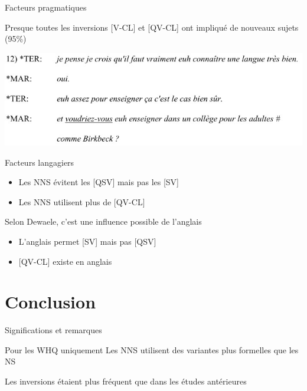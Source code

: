 \documentclass{beamer}
\begin{document}
    \begin{frame}{Facteurs pragmatiques}
      \begin{block}{}
        Presque toutes les inversions [V-CL] et [QV-CL] ont impliqué de nouveaux sujets (95\%)
      \end{block}
      \includegraphics[scale=0.6]{inversion.jpg}
    \end{frame}

    \begin{frame}{Facteurs langagiers}
      \begin{block}{}
        \begin{itemize}
          \item Les NNS évitent les [QSV] mais pas les [SV]
          \item Les NNS utilisent plus de [QV-CL]
        \end{itemize}
      \end{block}
      \begin{block}{Selon Dewaele, c'est une influence possible de l'anglais}
        \begin{itemize}
          \item L'anglais permet [SV] mais pas [QSV]
          \item {[}QV-CL] existe en anglais
        \end{itemize}
      \end{block}
    \end{frame}

  \section{Conclusion}
    \begin{frame}{Significations et remarques}
      \begin{block}{Pour les WHQ uniquement}
        Les NNS utilisent des variantes plus formelles que les NS
      \end{block}
      \begin{block}{}
        Les inversions étaient plus fréquent que dans les études antérieures
      \end{block}
    \end{frame}
\end{document}
